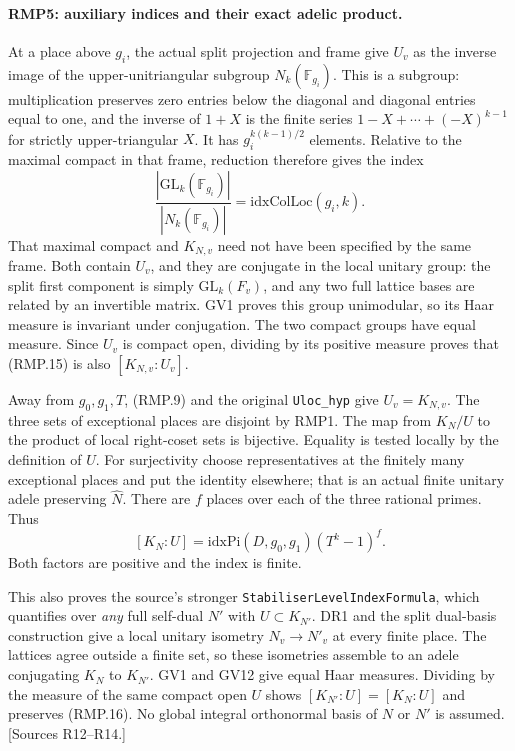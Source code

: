 \paragraph{RMP5: auxiliary indices and their exact adelic product.}
\label{claim:RMP5}
At a place above $g_i$, the actual split projection and frame give
$U_v$ as the inverse image of the upper-unitriangular subgroup
$N_k(\mathbb F_{g_i})$. This is a subgroup: multiplication preserves
zero entries below the diagonal and diagonal entries equal to one,
and the inverse of $1+X$ is the finite series
$1-X+\cdots+(-X)^{k-1}$ for strictly upper-triangular $X$.
It has $g_i^{k(k-1)/2}$ elements. Relative to the maximal compact
in that frame, reduction therefore gives the index
\[
 \frac{|\mathrm{GL}_k(\mathbb F_{g_i})|}
      {|N_k(\mathbb F_{g_i})|}
       =\mathrm{idxColLoc}(g_i,k).                    \tag{RMP.15}
\]
That maximal compact and $K_{N,v}$ need not have been specified by
the same frame. Both contain $U_v$, and they are conjugate in the
local unitary group: the split first component is simply
$\mathrm{GL}_k(F_v)$, and any two full lattice bases are related
by an invertible matrix. GV1 proves this group unimodular, so its
Haar measure is invariant under conjugation. The two compact groups
have equal measure. Since $U_v$ is compact open, dividing by its
positive measure proves that (RMP.15) is also $[K_{N,v}:U_v]$.

Away from $g_0,g_1,T$, (RMP.9) and the original
\texttt{Uloc\_hyp} give $U_v=K_{N,v}$.
The three sets of exceptional places are disjoint by RMP1.
The map from $K_N/U$ to the product of local right-coset sets is
bijective. Equality is tested locally by the definition of $U$.
For surjectivity choose representatives at the finitely many
exceptional places and put the identity elsewhere; that is an
actual finite unitary adele preserving $\widehat N$.
There are $f$ places over each of the three rational primes.
Thus
\[
 \boxed{[K_N:U]=\mathrm{idxPi}(D,g_0,g_1)(T^k-1)^f.}   \tag{RMP.16}
\]
Both factors are positive and the index is finite.

This also proves the source's stronger
\texttt{StabiliserLevelIndexFormula}, which quantifies over
\emph{any} full self-dual $N'$ with $U\subset K_{N'}$.
DR1 and the split dual-basis construction give a local unitary
isometry $N_v\to N'_v$ at every finite place. The lattices agree
outside a finite set, so these isometries assemble to an adele
conjugating $K_N$ to $K_{N'}$. GV1 and GV12 give equal Haar
measures. Dividing by the measure of the same compact open $U$
shows $[K_{N'}:U]=[K_N:U]$ and preserves (RMP.16).
No global integral orthonormal basis of $N$ or $N'$ is assumed.
[Sources R12--R14.]

